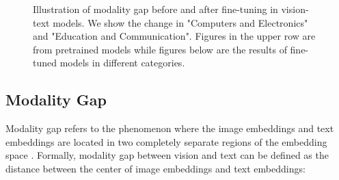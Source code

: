 \documentclass[11pt]{article}
\begin{document}
\begin{figure}[htbp]
        \hspace{5mm}
    \caption{\label{fig:mg-change}Illustration of modality gap before and after fine-tuning in vision-text models. We show the change in "Computers and Electronics" and "Education and Communication". Figures in the upper row are from pretrained models while figures below are the results of fine-tuned models in different categories.}
\end{figure}


\subsection{Modality Gap}

Modality gap refers to the phenomenon where the image embeddings and text embeddings are located in two completely separate regions of the embedding space \citep{liang2022mind}. Formally, modality gap between vision and text can be defined as the distance between the center of image embeddings and text embeddings: 
\end{document}
